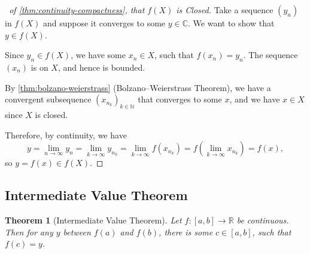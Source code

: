 \documentclass[11pt]{article}
\numberwithin{equation}{section}
\newtheorem{theorem}{Theorem}[section]
\theoremstyle{definition}
\theoremstyle{remark}
\newcommand{\pqty}[1]{\left(#1\right)}
\newcommand{\ccintv}[2]{[#1,#2]}
\newcommand{\functiondomain}[3]{#1:#2\to #3}
\newcommand{\RR}{\mathbb R}
\newcommand{\CC}{\mathbb C}
\newcommand{\NN}{\mathbb N}
\begin{document}
\begin{proof}[\proofname\ of \autoref{thm:continuity-compactness}, that \(f\pqty{X}\) is Closed]
    Take a sequence \(\pqty{y_n}\) in \(f\pqty{X}\) and suppose it converges to some \(y \in \CC\). We want to show that \(y \in f\pqty{X}\).

    Since \(y_n \in f\pqty{X}\), we have some \(x_n \in X\), such that \(f\pqty{x_n} = y_n\). The sequence \(\pqty{x_n}\) is on \(X\), and hence is bounded.
    
    By \autoref{thm:bolzano-weierstrass} (Bolzano--Weierstrass Theorem), we have a convergent subsequence \(\pqty{x_{n_k}}_{k \in \NN}\) that converges to some \(x\), and we have \(x \in X\) since \(X\) is closed.

    Therefore, by continuity, we have
    \[
        y = \lim_{n \to \infty} y_n = \lim_{k \to \infty} y_{n_k} = \lim_{k \to \infty} f\pqty{x_{n_k}} = f\pqty{\lim_{k \to \infty} x_{n_k}} = f\pqty{x},
    \]
    so \(y = f\pqty{x} \in f\pqty{X}\).
\end{proof}

\subsection{Intermediate Value Theorem}

\begin{theorem}[Intermediate Value Theorem]\label{analysis-unit-0095}
    \label{thm:intermediate-value}%
    Let \(\functiondomain{f}{\ccintv{a}{b}}{\RR}\) be continuous. Then for any \(y\) between \(f\pqty{a}\) and \(f\pqty{b}\), there is some \(c \in \ccintv{a}{b}\), such that \(f\pqty{c} = y\).
\end{theorem}
\end{document}
